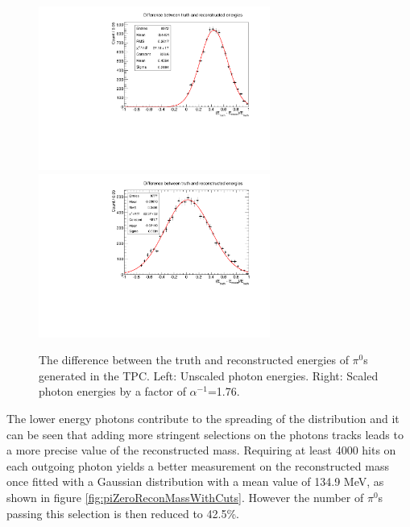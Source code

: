 \begin{figure}[htbp]
\begin{center}
  	\includegraphics[width=76mm]{Chapter4/figures/piZeroEnergyDiffUnscaledNoCuts.pdf}
  	\includegraphics[width=76mm]{Chapter4/figures/piZeroEnergyDiffScaledNoCuts.pdf}
		\caption{The difference between the truth and reconstructed energies of $\pi^{0}$s generated in the TPC. Left: Unscaled photon energies. Right: Scaled photon energies by a factor of $\alpha^{-1}$=1.76.}
	\label{fig:piZeroReconEnergyDiff}
\end{center}
\end{figure}

The lower energy photons contribute to the spreading of the distribution and it can be seen that adding more stringent selections on the photons tracks leads to a more precise value of the reconstructed mass. Requiring at least 4000 hits on each outgoing photon yields a better measurement on the reconstructed mass once fitted with a Gaussian distribution with a mean value of 134.9 MeV, as shown in figure \ref{fig:piZeroReconMassWithCuts}. However the number of $\pi^{0}$s passing this selection is then reduced to 42.5\%.

